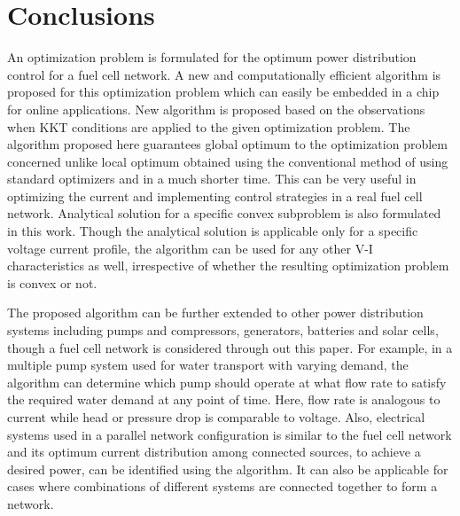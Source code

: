 \documentclass[twocolumn]{autart}
\begin{document}
\section{Conclusions}
An optimization problem is formulated for the optimum power distribution control for a fuel cell network. A new and computationally efficient algorithm is proposed for this optimization problem which can easily be embedded in a chip for online applications. New algorithm is proposed based on the observations when KKT conditions are applied to the given optimization problem. The algorithm proposed here guarantees global optimum to the optimization problem concerned unlike local optimum obtained using the conventional method of using standard optimizers and in a much shorter time. This can be very useful in optimizing the current and implementing control strategies in a real fuel cell network. Analytical solution for a specific convex subproblem is also formulated in this work. Though the analytical solution is applicable only for a specific voltage current profile, the algorithm can be used for any other V-I characteristics as well, irrespective of whether the resulting optimization problem is convex or not. 

The proposed algorithm can be further extended to other power distribution systems including pumps and compressors, generators, batteries and solar cells, though a fuel cell network is considered through out this paper. For example, in a  multiple pump system used for water transport with varying demand, the algorithm can determine which pump should operate at what flow rate to satisfy the required water demand at any point of time. Here, flow rate is analogous to current while head or pressure drop is comparable to voltage. Also, electrical systems used in a parallel network configuration is similar to the fuel cell network and its optimum current distribution among connected sources, to achieve a desired power, can be identified using the algorithm. It can also be applicable for cases where combinations of different systems are connected together to form a network.  


                  

\appendix
\end{document}

